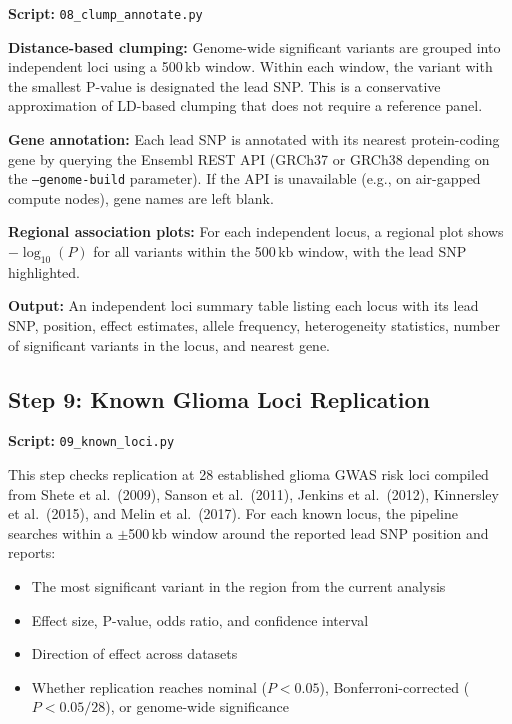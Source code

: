\documentclass[11pt,letterpaper]{article}
\begin{document}
\textbf{Script:} \texttt{08\_clump\_annotate.py}

\textbf{Distance-based clumping:} Genome-wide significant variants are grouped into independent loci using a 500\,kb window. Within each window, the variant with the smallest P-value is designated the lead SNP. This is a conservative approximation of LD-based clumping that does not require a reference panel.

\textbf{Gene annotation:} Each lead SNP is annotated with its nearest protein-coding gene by querying the Ensembl REST API (GRCh37 or GRCh38 depending on the \texttt{--genome-build} parameter). If the API is unavailable (e.g., on air-gapped compute nodes), gene names are left blank.

\textbf{Regional association plots:} For each independent locus, a regional plot shows $-\log_{10}(P)$ for all variants within the 500\,kb window, with the lead SNP highlighted.

\textbf{Output:} An independent loci summary table listing each locus with its lead SNP, position, effect estimates, allele frequency, heterogeneity statistics, number of significant variants in the locus, and nearest gene.

\subsection{Step 9: Known Glioma Loci Replication}
\label{sec:step9}

\textbf{Script:} \texttt{09\_known\_loci.py}

This step checks replication at 28 established glioma GWAS risk loci compiled from Shete et al.\ (2009), Sanson et al.\ (2011), Jenkins et al.\ (2012), Kinnersley et al.\ (2015), and Melin et al.\ (2017). For each known locus, the pipeline searches within a $\pm$500\,kb window around the reported lead SNP position and reports:

\begin{itemize}[nosep]
    \item The most significant variant in the region from the current analysis
    \item Effect size, P-value, odds ratio, and confidence interval
    \item Direction of effect across datasets
    \item Whether replication reaches nominal ($P < 0.05$), Bonferroni-corrected ($P < 0.05/28$), or genome-wide significance
\end{itemize}
\end{document}
